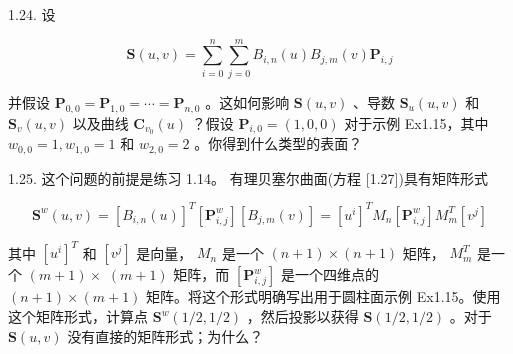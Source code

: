 \documentclass[../main.tex]{subfiles}
\begin{document}
1.24. 设

\[
\mathbf{S}\left( {u,v}\right)  = \mathop{\sum }\limits_{{i = 0}}^{n}\mathop{\sum }\limits_{{j = 0}}^{m}{B}_{i,n}\left( u\right) {B}_{j,m}\left( v\right) {\mathbf{P}}_{i,j}
\]

并假设 \({\mathbf{P}}_{0,0} = {\mathbf{P}}_{1,0} = \cdots  = {\mathbf{P}}_{n,0}\) 。这如何影响 \(\mathbf{S}\left( {u,v}\right)\) 、导数 \({\mathbf{S}}_{u}\left( {u,v}\right)\) 和 \({\mathbf{S}}_{v}\left( {u,v}\right)\) 以及曲线 \({\mathbf{C}}_{{v}_{0}}\left( u\right)\) ？假设 \({\mathbf{P}}_{i,0} = \left( {1,0,0}\right)\) 对于示例 Ex1.15，其中 \({w}_{0,0} = 1,{w}_{1,0} = 1\) 和 \({w}_{2,0} = 2\) 。你得到什么类型的表面？

1.25. 这个问题的前提是练习 1.14。 有理贝塞尔曲面(方程 [1.27])具有矩阵形式

\[
{\mathbf{S}}^{w}\left( {u,v}\right)  = {\left\lbrack  {B}_{i,n}\left( u\right) \right\rbrack  }^{T}\left\lbrack  {\mathbf{P}}_{i,j}^{w}\right\rbrack  \left\lbrack  {{B}_{j,m}\left( v\right) }\right\rbrack   = {\left\lbrack  {u}^{i}\right\rbrack  }^{T}{M}_{n}\left\lbrack  {\mathbf{P}}_{i,j}^{w}\right\rbrack  {M}_{m}^{T}\left\lbrack  {v}^{j}\right\rbrack
\]

其中 \({\left\lbrack  {u}^{i}\right\rbrack  }^{T}\) 和 \(\left\lbrack  {v}^{j}\right\rbrack\) 是向量， \({M}_{n}\) 是一个 \(\left( {n + 1}\right)  \times  \left( {n + 1}\right)\) 矩阵， \({M}_{m}^{T}\) 是一个 \(\left( {m + 1}\right)  \times\)  \(\left( {m + 1}\right)\) 矩阵，而 \(\left\lbrack  {\mathbf{P}}_{i,j}^{w}\right\rbrack\) 是一个四维点的 \(\left( {n + 1}\right)  \times  \left( {m + 1}\right)\) 矩阵。将这个形式明确写出用于圆柱面示例 Ex1.15。使用这个矩阵形式，计算点 \({\mathbf{S}}^{w}\left( {1/2,1/2}\right)\) ，然后投影以获得 \(\mathbf{S}\left( {1/2,1/2}\right)\) 。对于 \(\mathbf{S}\left( {u,v}\right)\) 没有直接的矩阵形式；为什么？


\clearpage
\end{document}
